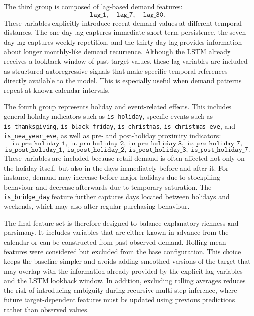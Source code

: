 The third group is composed of lag-based demand features:
\[
\texttt{lag\_1}, \quad \texttt{lag\_7}, \quad \texttt{lag\_30}.
\]
These variables explicitly introduce recent demand values at different temporal distances. The one-day lag captures immediate short-term persistence, the seven-day lag captures weekly repetition, and the thirty-day lag provides information about longer monthly-like demand recurrence. Although the LSTM already receives a lookback window of past target values, these lag variables are included as structured autoregressive signals that make specific temporal references directly available to the model. This is especially useful when demand patterns repeat at known calendar intervals.

The fourth group represents holiday and event-related effects. This includes general holiday indicators such as \texttt{is\_holiday}, specific events such as \texttt{is\_thanksgiving}, \texttt{is\_black\_friday}, \texttt{is\_christmas}, \texttt{is\_christmas\_eve}, and \texttt{is\_new\_year\_eve}, as well as pre- and post-holiday proximity indicators:
\[
\texttt{is\_pre\_holiday\_1},\ 
\texttt{is\_pre\_holiday\_2},\ 
\texttt{is\_pre\_holiday\_3},\ 
\texttt{is\_pre\_holiday\_7},
\]
\[
\texttt{is\_post\_holiday\_1},\ 
\texttt{is\_post\_holiday\_2},\ 
\texttt{is\_post\_holiday\_3},\ 
\texttt{is\_post\_holiday\_7}.
\]
These variables are included because retail demand is often affected not only on the holiday itself, but also in the days immediately before and after it. For instance, demand may increase before major holidays due to stockpiling behaviour and decrease afterwards due to temporary saturation. The \texttt{is\_bridge\_day} feature further captures days located between holidays and weekends, which may also alter regular purchasing behaviour.

The final feature set is therefore designed to balance explanatory richness and parsimony. It includes variables that are either known in advance from the calendar or can be constructed from past observed demand. Rolling-mean features were considered but excluded from the base configuration. This choice keeps the baseline simpler and avoids adding smoothed versions of the target that may overlap with the information already provided by the explicit lag variables and the LSTM lookback window. In addition, excluding rolling averages reduces the risk of introducing ambiguity during recursive multi-step inference, where future target-dependent features must be updated using previous predictions rather than observed values.

